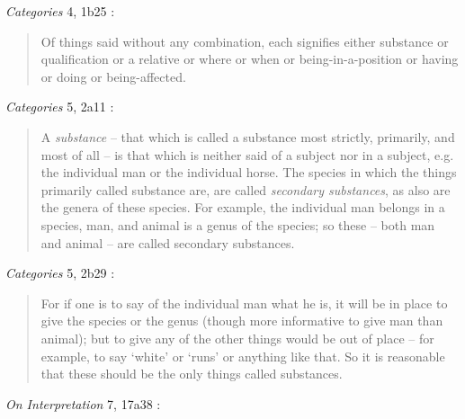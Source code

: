 \documentclass{article}
\begin{document}
{\em Categories} 4, 1b25 \cite[p.~5]{ackrill}:

\begin{quote}
Of things said without any combination, each signifies either substance or qualification or a relative or where
or when or being-in-a-position or having or doing or being-affected.
\end{quote}

{\em Categories} 5, 2a11 \cite[pp.~5--6]{ackrill}:

\begin{quote}
A {\em substance} -- that which is called a substance most strictly, primarily, and most of all -- is that
which is neither said of a subject nor in a subject, e.g. the individual man or the individual horse. The species in which
the things primarily called substance are, are called {\em secondary substances}, as also are the genera of these species.
For example, the individual man belongs in a species, man, and animal is a genus of the species; so these -- both man and animal --
are called secondary substances.
\end{quote}

{\em Categories} 5, 2b29  \cite[pp.~7--8]{ackrill}:

\begin{quote}
For if one is to say of the individual man what he is, it will be in place to give the species or the genus
(though more informative to give man than animal); but to give any of the other things would be out of place -- for example,
to say `white' or `runs' or anything like that. So it is reasonable that these should be the only things called substances.
\end{quote}











{\em On Interpretation} 7, 17a38 \cite[pp.~47--48]{ackrill}:
\end{document}
